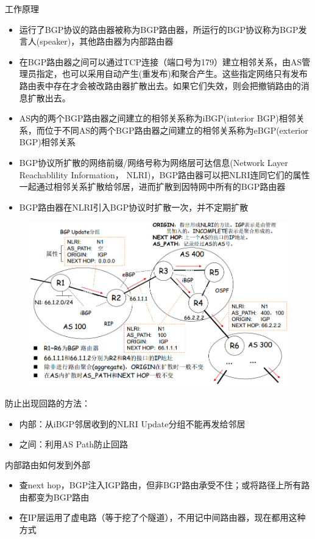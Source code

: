 工作原理
\begin{itemize}
\item 运行了BGP协议的路由器被称为BGP路由器，所运行的BGP协议称为BGP发言人(speaker)，其他路由器为内部路由器
\item 在BGP路由器之间可以通过TCP连接（端口号为179）建立相邻关系，由AS管理员指定，也可以采用自动产生(重发布)和聚合产生。这些指定网络只有发布路由表中存在才会被改路由器扩散出去。如果它们失效，则会把撤销路由的消息扩散出去。
\item AS内的两个BGP路由器之间建立的相邻关系称为iBGP(interior BGP)相邻关系，而位于不同AS的两个BGP路由器之间建立的相邻关系称为eBGP(exterior BGP)相邻关系
\item  BGP协议所扩散的网络前缀/网络号称为网络层可达信息(Network Layer Reachablility Information， NLRI)，BGP路由器可以把NLRI连同它们的属性一起通过相邻关系扩散给邻居，进而扩散到因特网中所有的BGP路由器
\item BGP路由器在NLRI引入BGP协议时扩散一次，并不定期扩散
\end{itemize}
\begin{figure}[H]
	\centering
	\includegraphics[width=0.8\linewidth]{fig/NLRI.png}
\end{figure}

防止出现回路的方法：
\begin{itemize}
\item 内部：从iBGP邻居收到的NLRI Update分组不能再发给邻居
\item 之间：利用AS Path防止回路
\end{itemize}

内部路由如何发到外部
\begin{itemize}
\item 查next hop，BGP注入IGP路由，但非BGP路由承受不住；或将路径上所有路由都变为BGP路由
\item 在IP层运用了虚电路（等于挖了个隧道），不用记中间路由器，现在都用这种方式
\end{itemize}

